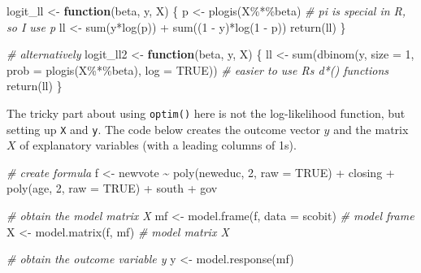 \documentclass[
]{book}
\newenvironment{Shaded}{\begin{snugshade}}{\end{snugshade}}
\newcommand{\AttributeTok}[1]{\textcolor[rgb]{0.77,0.63,0.00}{#1}}
\newcommand{\CommentTok}[1]{\textcolor[rgb]{0.56,0.35,0.01}{\textit{#1}}}
\newcommand{\ConstantTok}[1]{\textcolor[rgb]{0.00,0.00,0.00}{#1}}
\newcommand{\ControlFlowTok}[1]{\textcolor[rgb]{0.13,0.29,0.53}{\textbf{#1}}}
\newcommand{\DecValTok}[1]{\textcolor[rgb]{0.00,0.00,0.81}{#1}}
\newcommand{\FunctionTok}[1]{\textcolor[rgb]{0.00,0.00,0.00}{#1}}
\newcommand{\NormalTok}[1]{#1}
\newcommand{\OtherTok}[1]{\textcolor[rgb]{0.56,0.35,0.01}{#1}}
\newcommand{\SpecialCharTok}[1]{\textcolor[rgb]{0.00,0.00,0.00}{#1}}
\begin{document}
\begin{Shaded}
\begin{Highlighting}[]
\NormalTok{logit\_ll }\OtherTok{\textless{}{-}} \ControlFlowTok{function}\NormalTok{(beta, y, X) \{}
\NormalTok{  p }\OtherTok{\textless{}{-}} \FunctionTok{plogis}\NormalTok{(X}\SpecialCharTok{\%*\%}\NormalTok{beta)  }\CommentTok{\# pi is special in R, so I use p}
\NormalTok{  ll }\OtherTok{\textless{}{-}} \FunctionTok{sum}\NormalTok{(y}\SpecialCharTok{*}\FunctionTok{log}\NormalTok{(p)) }\SpecialCharTok{+} \FunctionTok{sum}\NormalTok{((}\DecValTok{1} \SpecialCharTok{{-}}\NormalTok{ y)}\SpecialCharTok{*}\FunctionTok{log}\NormalTok{(}\DecValTok{1} \SpecialCharTok{{-}}\NormalTok{ p))}
  \FunctionTok{return}\NormalTok{(ll)}
\NormalTok{\}}

\CommentTok{\# alternatively}
\NormalTok{logit\_ll2 }\OtherTok{\textless{}{-}} \ControlFlowTok{function}\NormalTok{(beta, y, X) \{}
\NormalTok{  ll }\OtherTok{\textless{}{-}} \FunctionTok{sum}\NormalTok{(}\FunctionTok{dbinom}\NormalTok{(y, }\AttributeTok{size =} \DecValTok{1}\NormalTok{, }\AttributeTok{prob =} \FunctionTok{plogis}\NormalTok{(X}\SpecialCharTok{\%*\%}\NormalTok{beta), }\AttributeTok{log =} \ConstantTok{TRUE}\NormalTok{))  }\CommentTok{\# easier to use R\textquotesingle{}s d*() functions}
  \FunctionTok{return}\NormalTok{(ll)}
\NormalTok{\}}
\end{Highlighting}
\end{Shaded}

The tricky part about using \texttt{optim()} here is not the
log-likelihood function, but setting up \texttt{X} and \texttt{y}. The
code below creates the outcome vector \(y\) and the matrix \(X\) of
explanatory variables (with a leading columns of 1s).

\begin{Shaded}
\begin{Highlighting}[]
\CommentTok{\# create formula}
\NormalTok{f }\OtherTok{\textless{}{-}}\NormalTok{ newvote }\SpecialCharTok{\textasciitilde{}} \FunctionTok{poly}\NormalTok{(neweduc, }\DecValTok{2}\NormalTok{, }\AttributeTok{raw =} \ConstantTok{TRUE}\NormalTok{) }\SpecialCharTok{+}\NormalTok{ closing }\SpecialCharTok{+} \FunctionTok{poly}\NormalTok{(age, }\DecValTok{2}\NormalTok{, }\AttributeTok{raw =} \ConstantTok{TRUE}\NormalTok{) }\SpecialCharTok{+}\NormalTok{ south }\SpecialCharTok{+}\NormalTok{ gov}

\CommentTok{\# obtain the model matrix X}
\NormalTok{mf }\OtherTok{\textless{}{-}} \FunctionTok{model.frame}\NormalTok{(f, }\AttributeTok{data =}\NormalTok{ scobit)  }\CommentTok{\# model frame}
\NormalTok{X }\OtherTok{\textless{}{-}} \FunctionTok{model.matrix}\NormalTok{(f, mf)         }\CommentTok{\# model matrix X}

\CommentTok{\# obtain the outcome variable y}
\NormalTok{y }\OtherTok{\textless{}{-}} \FunctionTok{model.response}\NormalTok{(mf)}
\end{Highlighting}
\end{Shaded}
\end{document}
